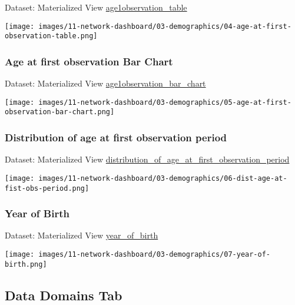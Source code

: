 \documentclass[
]{book}
\begin{document}
Dataset: Materialized View \href{materialized-views-1.html\#age1observation_table}{age1observation\_table}

\texttt{[image: images/11-network-dashboard/03-demographics/04-age-at-first-observation-table.png]}

\hypertarget{age-at-first-observation-bar-chart}{%
\subsubsection*{Age at first observation Bar Chart}\label{age-at-first-observation-bar-chart}}

Dataset: Materialized View \href{materialized-views-1.html\#age1observation_bar_chart}{age1observation\_bar\_chart}

\texttt{[image: images/11-network-dashboard/03-demographics/05-age-at-first-observation-bar-chart.png]}

\hypertarget{distribution-of-age-at-first-observation-period}{%
\subsubsection*{Distribution of age at first observation period}\label{distribution-of-age-at-first-observation-period}}

Dataset: Materialized View \href{materialized-views-1.html\#distribution_of_age_at_first_observation_period}{distribution\_of\_age\_at\_first\_observation\_period}

\texttt{[image: images/11-network-dashboard/03-demographics/06-dist-age-at-fist-obs-period.png]}

\hypertarget{year-of-birth}{%
\subsubsection*{Year of Birth}\label{year-of-birth}}

Dataset: Materialized View \href{materialized-views-1.html\#year_of_birth}{year\_of\_birth}

\texttt{[image: images/11-network-dashboard/03-demographics/07-year-of-birth.png]}

\hypertarget{data-domains-tab}{%
\subsection*{Data Domains Tab}\label{data-domains-tab}}
\end{document}
